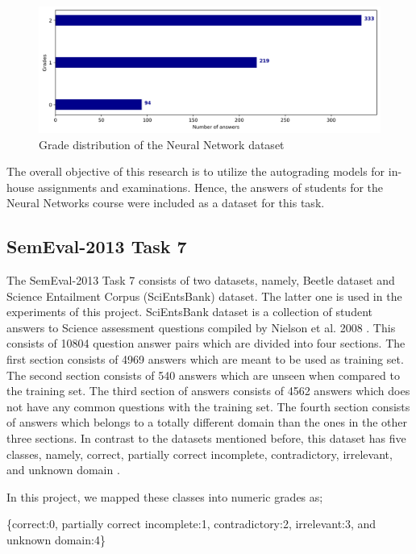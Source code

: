 	\begin{figure}[h]
		\centering
		\includegraphics[scale=0.3]{images/nngrades}
		\caption{Grade distribution of the Neural Network dataset}
		\label{nngrades}
	\end{figure} 

	The overall objective of this research is to utilize the autograding models for in-house assignments and examinations. Hence, the answers of students for the Neural Networks course were included as a dataset for this task.
	
	\subsection{SemEval-2013 Task 7}
	
	The SemEval-2013 Task 7 consists of two datasets, namely, Beetle dataset and Science Entailment Corpus (SciEntsBank) dataset. The latter one is used in the experiments of this project. SciEntsBank dataset is a collection of student answers to Science assessment questions compiled by Nielson et al. 2008 \cite{nielsen2008annotating}. This consists of 10804 question answer pairs which are divided into four sections. The first section consists of 4969 answers which are meant to be used as training set. The second section consists of 540 answers which are unseen when compared to the training set. The third section of answers consists of 4562 answers which does not have any common questions with the training set. The fourth section consists of answers which belongs to a totally different domain than the ones in the other three sections. In contrast to the datasets mentioned before, this dataset has five classes, namely, correct, partially correct incomplete, contradictory, irrelevant, and unknown domain \cite{dzikovska2013}. 
	
	In this project, we mapped these classes into numeric grades as;
	
	\{correct:0, partially correct incomplete:1, contradictory:2, irrelevant:3, and unknown domain:4\} 
	
